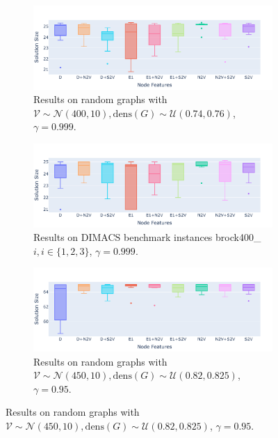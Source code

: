 \documentclass[draft,final]{vutinfth} %
\begin{document}
\begin{figure}
    \centering
    \begin{subfigure}{0.9\textwidth}
        \centering
        \includegraphics[width=\textwidth]{graphics/V400-074-076-random.pdf}
        \caption{Results on random graphs with $\mathcal{V} \sim \mathcal{N}(400, 10), \mathrm{dens}(G) \sim \mathcal{U}(0.74,0.76)$, $\gamma=0.999$.}
    \end{subfigure}
    \begin{subfigure}{0.9\textwidth}
        \centering
        \includegraphics[width=\textwidth]{graphics/V400-074-076-benchmark.pdf}
        \caption{Results on DIMACS benchmark instances brock400\_$i, i \in \{1,2,3\}$, $\gamma=0.999$.}
    \end{subfigure}
    \centering
    \begin{subfigure}{0.9\textwidth}
        \centering
        \includegraphics[width=\textwidth]{graphics/V450-082-0825-random.pdf}
        \caption{Results on random graphs with $\mathcal{V} \sim \mathcal{N}(450, 10), \mathrm{dens}(G) \sim \mathcal{U}(0.82,0.825)$, $\gamma=0.95$.}
    \end{subfigure}

\end{figure}
\end{document}
